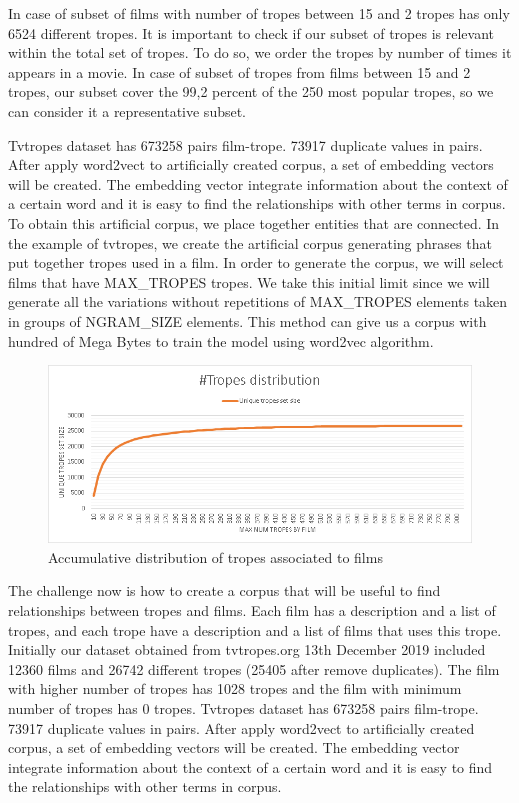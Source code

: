 \documentclass[letterpaper]{article}
\begin{document}
	
	In case of subset of films with number of tropes between 15 and 2 tropes has only 6524 different tropes. 
    It is important to check if our subset of tropes is relevant within the total set of tropes. To do so, we order the tropes by number of times it appears in a movie. In case of subset of tropes from films between 15 and 2 tropes, our subset cover the 99,2 percent of the 250 most popular tropes, so we can consider it a representative subset. 
	
	
	Tvtropes dataset has 673258 pairs film-trope. 73917 duplicate values in pairs. After apply word2vect to artificially created corpus, a set of embedding vectors will be created. The embedding vector integrate information about the context of a certain word and it is easy to find the relationships with other terms in corpus.\\
	To obtain this artificial corpus, we place together entities that are connected. In the example of tvtropes, we create the artificial corpus generating phrases that put together tropes used in a film. In order to generate the corpus, we will select films that have MAX\_TROPES tropes. We take this initial limit since we will generate all the variations without repetitions of MAX\_TROPES elements taken in groups of NGRAM\_SIZE elements. This method can give us a corpus with hundred of Mega Bytes to train the model using word2vec algorithm. \\
	
	\begin{figure}
		\centering
		\includegraphics[width=0.9\linewidth]{../images/tropes_distribution_chart.png}
		\caption{Accumulative distribution of tropes associated to films}
		\label{fig:tropesdistributionasociatedtofilms}
	\end{figure}
	
	The challenge now is how to create a corpus that will be useful to find relationships between tropes and films. Each film has a description and a list of tropes, and each trope have a description and a list of films that uses this trope. Initially our dataset obtained from tvtropes.org 13th December 2019 included 12360 films and 26742 different tropes (25405 after remove duplicates). The film with higher number of tropes has 1028 tropes and the film with minimum number of tropes has 0 tropes. Tvtropes dataset has 673258 pairs film-trope. 73917 duplicate values in pairs. After apply word2vect to artificially created corpus, a set of embedding vectors will be created. The embedding vector integrate information about the context of a certain word and it is easy to find the relationships with other terms in corpus.\\
	
\end{document}
